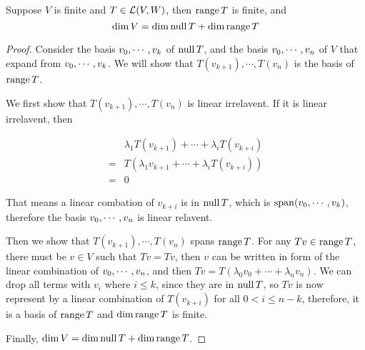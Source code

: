 \documentclass[../main.tex]{subfiles}
\begin{document}
\setcounter{theorem}{20}
\begin{theorem}
  Suppose $V$ is finite and $T \in \mathcal{L}(V, W)$, then $\operatorname{range} T$ is finite, and
  \[
  \dim V = \dim \operatorname{null} T + \dim \operatorname{range} T
  \]
\end{theorem}
\begin{proof}
  Consider the basis $v_0 , \cdots , v_{k}$ of $\operatorname{null} T$, and the basis $v_0 , \cdots , v_{n}$ of $V$ that expand from $v_0 , \cdots , v_{k}$.
  We will show that $T(v_{k + 1}) , \cdots , T(v_n)$ is the basis of $\operatorname{range} T$.

  We first show that $T(v_{k + 1}) , \cdots , T(v_n)$ is linear irrelavent. If it is linear irrelavent,
  then

  \begin{align*}
     & \lambda_1 T(v_{k + 1}) + \cdots + \lambda_i T(v_{k + i}) \\
    =& T(\lambda_1 v_{k + 1} + \cdots + \lambda_i T(v_{k + i})) \\
    =& 0
  \end{align*}

  That means a linear combation of $v_{k + i}$ is in $\operatorname{null} T$, which is $\operatorname{span}(v_0 , \cdots , v_{k})$,
  therefore the basis $v_0 , \cdots , v_{n}$ is linear relavent.

  Then we show that $T(v_{k + 1}) , \cdots , T(v_n)$ spans $\operatorname{range} T$. For any $Tv \in \operatorname{range} T$,
  there must be $v \in V$ such that $Tv = Tv$, then $v$ can be written in form of the linear combination
  of $v_0 , \cdots , v_{n}$, and then $Tv = T(\lambda_0v_0 + \cdots + \lambda_nv_n)$.
  We can drop all terms with $v_i$ where $i \le k$, since they are in $\operatorname{null} T$,
  so $Tv$ is now represent by a linear combination of $T(v_{k + i})$ for all $0 < i \le n - k$,
  therefore, it is a basis of $\operatorname{range} T$ and $\dim \operatorname{range} T$ is finite.

  Finally, $\dim V = \dim \operatorname{null} T + \dim \operatorname{range} T$.
\end{proof}
\end{document}
